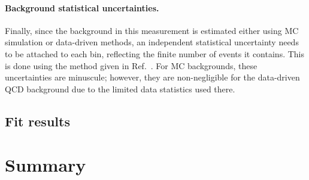 \paragraph{Background statistical uncertainties.}

Finally, since the background in this measurement is estimated either using MC simulation or data-driven methods, an independent statistical uncertainty needs to be attached to each bin, reflecting the finite number of events it contains. This is done using the method given in Ref.~\cite{Barlow:1993dm}. For MC backgrounds, these uncertainties are minuscule; however, they are non-negligible for the data-driven QCD background due to the limited data statistics used there.

\subsection{Fit results}

\section{Summary}